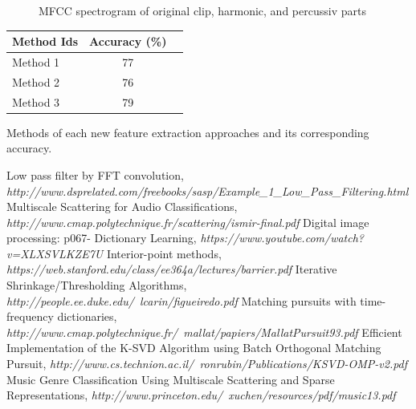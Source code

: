 \documentclass[final]{siamltexmm}
\begin{document}
\begin{figure}[!ht]
  \centering
  \caption{MFCC spectrogram of original clip, harmonic, and percussiv parts}
\end{figure}

\begin{center}
  \begin{tabular}{ l || c | r }
    \hline
    Method Ids & Accuracy (\%) \\ \hline \hline
    Method 1 & 77 \\ \hline
    Method 2 & 76 \\ \hline
    Method 3 & 79 \\ \hline
    \hline
  \end{tabular}
  \begin{tablenotes}
    \small
    \item Methods of each new feature extraction approaches and its corresponding accuracy.
  \end{tablenotes}
\end{center}

\begin{thebibliography}{10}
 {\sc Low pass filter by FFT convolution}, {\em http://www.dsprelated.com/freebooks/sasp/Example\_1\_Low\_Pass\_Filtering.html}
 {\sc Multiscale Scattering for Audio Classifications}, {\em http://www.cmap.polytechnique.fr/scattering/ismir-final.pdf}
 {\sc Digital image processing: p067- Dictionary Learning}, {\em https://www.youtube.com/watch?v=XLXSVLKZE7U}
 {\sc Interior-point methods}, {\em https://web.stanford.edu/class/ee364a/lectures/barrier.pdf}
 {\sc Iterative Shrinkage/Thresholding Algorithms}, {\em http://people.ee.duke.edu/~lcarin/figueiredo.pdf}
 {\sc Matching pursuits with time-frequency dictionaries}, {\em http://www.cmap.polytechnique.fr/~mallat/papiers/MallatPursuit93.pdf}
 {\sc Efficient Implementation of the K-SVD Algorithm using Batch Orthogonal Matching Pursuit}, {\em http://www.cs.technion.ac.il/~ronrubin/Publications/KSVD-OMP-v2.pdf}
 {\sc Music Genre Classification Using Multiscale Scattering and Sparse Representations}, {\em http://www.princeton.edu/~xuchen/resources/pdf/music13.pdf}
\end{thebibliography}
\end{document}
